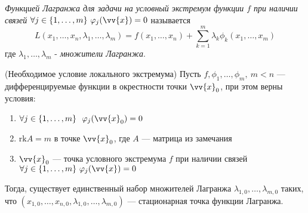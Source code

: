 \begin{definition}
	\textit{Функцией Лагранжа для задачи на условный экстремум функции $f$ при наличии связей $\forall j \in \range{m}\ \phi_j(\vv{x}) = 0$} называется
	\[
		L(x_1, \ldots, x_n, \lambda_1, \ldots, \lambda_m) = f(x_1, \ldots, x_n) + \sum_{k = 1}^m \lambda_k \phi_k(x_1, \ldots, x_m)
	\]
	где $\lambda_1, \ldots, \lambda_m$ - \textit{множители Лагранжа}.
\end{definition}

\begin{theorem} (Необходимое условие локального экстремума)
	Пусть $f, \phi_1, \ldots, \phi_m,\ m < n$ --- дифференцируемые функции в окрестности точки $\vv{x}_0$, при этом верны условия:
	\begin{enumerate}
		\item $\forall j \in \range{m}\ \ \phi_j(\vv{x}_0) = 0$
		
		\item $\text{rk} A = m$ в точке $\vv{x}_0$, где $A$ --- матрица из замечания
		
		\item $\vv{x}_0$ --- точка условного экстремума $f$ при наличии связей $\forall j \in \range{m}\ \phi_j(\vv{x}) = 0$
	\end{enumerate}
	Тогда, существует единственный набор множителей Лагранжа $\lambda_{1, 0}, \ldots, \lambda_{m, 0}$ таких, что $(x_{1, 0}, \ldots, x_{n, 0}, \lambda_{1, 0}, \ldots, \lambda_{m, 0})$ --- стационарная точка функции Лагранжа.
\end{theorem}

